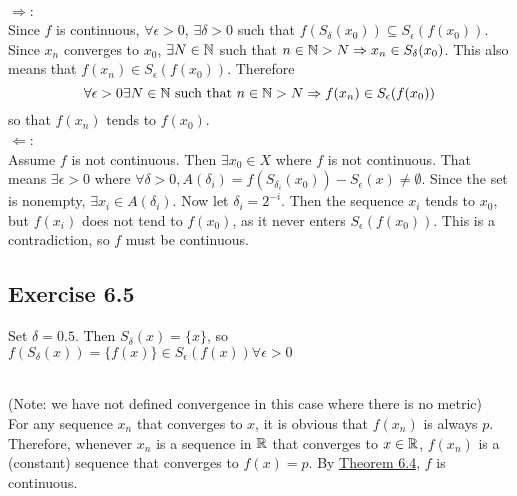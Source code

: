 \begin{solution}
 \\$\Rightarrow$: \\
Since $f$ is continuous, $\forall \epsilon > 0$, $\exists \delta > 0$ such that $f(S_\delta(x_0)) \subseteq S_\epsilon(f(x_0))$. Since $x_n$ converges to $x_0$, $\exists N \in \mathbb{N}$ such that $n \in \mathbb{N} > N \Rightarrow x_n \in S_\delta(x_0)$. This also means that $f(x_n) \in S_\epsilon(f(x_0))$. Therefore
$$\forall \epsilon > 0 \exists N \in \mathbb{N}\text{ such that } n \in \mathbb{N} > N \Rightarrow f(x_n) \in S_\epsilon(f(x_0))$$
so that $f(x_n)$ tends to $f(x_0)$. \\
$\Leftarrow$: \\
Assume $f$ is not continuous. Then $\exists x_0 \in X$ where $f$ is not continuous. That means $\exists \epsilon > 0$ where $\forall \delta > 0, A(\delta_i) = f(S_{\delta_i}(x_0)) - S_\epsilon(x) \neq \emptyset$. Since the set is nonempty, $\exists x_i \in A(\delta_i)$. Now let $\delta_i = 2^{-i}$. Then the sequence $x_i$ tends to $x_0$, but $f(x_i)$ does not tend to $f(x_0)$, as it never enters $S_\epsilon(f(x_0))$. This is a contradiction, so $f$ must be continuous.
\end{solution}

\subsection{Exercise 6.5}


\begin{solution}
 Set $\delta = 0.5$. Then $S_\delta(x) = \{x\}$, so $f(S_\delta(x)) = \{f(x)\} \in S_\epsilon(f(x)) \forall \epsilon > 0$
\end{solution}


\begin{solution}
 \\(Note: we have not defined convergence in this case where there is no metric) \\
 For any sequence $x_n$ that converges to $x$, it is obvious that $f(x_n)$ is always $p$. Therefore, whenever $x_n$ is a sequence in $\mathbb{R}$ that converges to $x \in \mathbb{R}$, $f(x_n)$ is a (constant) sequence that converges to $f(x) = p$. By \hyperref[thm3.6.4]{Theorem 6.4}, $f$ is continuous.
\end{solution}

